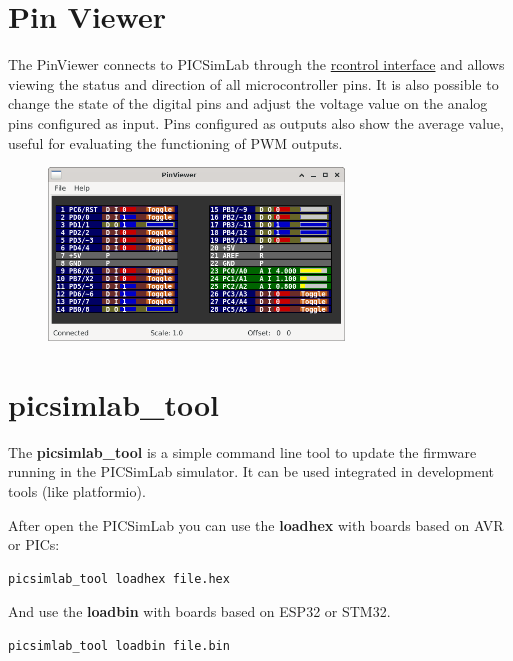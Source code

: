 \section{Pin Viewer} \hypertarget{def:pinv}{}

 The  PinViewer connects to PICSimLab through the \hyperlink{def:rcontrol}{rcontrol interface} 
 and allows viewing the status and direction of all microcontroller pins. 
 It is also possible to change the state of the digital pins and adjust the
 voltage value on the analog pins configured as input. Pins configured as outputs 
 also show the average value, useful for evaluating the functioning of PWM outputs. 
 
\begin{figure}[H]
\center
\includegraphics[width=0.7\textwidth]{img/pinviewer.png} 
\end{figure} 


\section{picsimlab\_tool} \hypertarget{def:ptool}{}

The \textbf{picsimlab\_tool} is a simple command line tool to update the firmware running in the PICSimLab simulator. 
It can be used integrated in development tools (like platformio).

After open the PICSimLab you can use the \textbf{loadhex} with boards based on AVR or PICs:
\begin{verbatim}
picsimlab_tool loadhex file.hex
\end{verbatim}

And use the \textbf{loadbin} with boards based on ESP32 or STM32.
\begin{verbatim}
picsimlab_tool loadbin file.bin
\end{verbatim}




